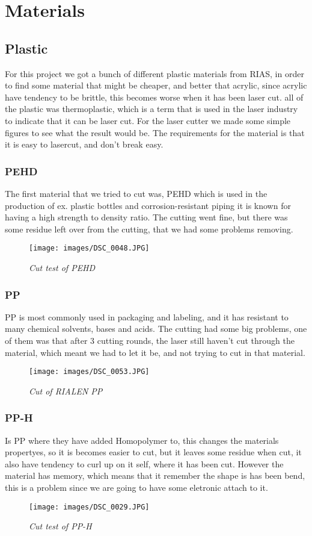 \section{Materials}
\subsection{Plastic}
For this project we got a bunch of different plastic materials from RIAS, in order to find some material that might be cheaper, and better that acrylic, since acrylic have tendency to be brittle, this becomes worse when it has been laser cut.
all of the plastic was thermoplastic, which is a term that is used in the laser industry to indicate that it can be laser cut.
For the laser cutter we made some simple figures to see what the result would be.
The requirements for the material is that it is easy to lasercut, and don't break easy.
\subsubsection{PEHD}
The first material that we tried to cut was, PEHD which is used in the production of ex. plastic bottles and corrosion-resistant piping it is known for having a high strength to density ratio.
The cutting went fine, but there was some residue left over from the cutting, that we had some problems removing.
\begin{figure}[!h]
	\centering
	\texttt{[image: images/DSC\_0048.JPG]}
	\caption{\small {\it {Cut test of PEHD}}} \label{fig:explode}
\end{figure}
\FloatBarrier
\subsubsection{ PP}
 PP is most commonly used in packaging and labeling, and it has resistant to many chemical solvents, bases and acids.
The cutting had some big problems, one of them was that after 3 cutting rounds, the laser still haven't cut through the material, which meant we had to let it be, and not trying to cut in that material.
\begin{figure}[!h]
	\centering
	\texttt{[image: images/DSC\_0053.JPG]}
	\caption{\small {\it {Cut of RIALEN PP}}} \label{fig:explode}
\end{figure}
\FloatBarrier
\subsubsection{PP-H}
Is PP where they have added Homopolymer to, this changes the materials propertyes, so it is becomes easier to cut, but it leaves some residue when cut, it also have tendency to curl up on it self, where it has been cut.
However the material has memory, which means that it remember the shape is has been bend, this is a problem since we are going to have some eletronic attach to it.
\begin{figure}[!h]
	\centering
	\texttt{[image: images/DSC\_0029.JPG]}
	\caption{\small {\it {Cut test of PP-H}}} \label{fig:explode}
\end{figure}
\FloatBarrier
